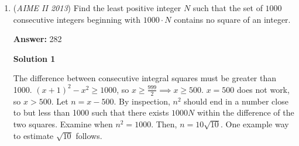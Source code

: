 \begin{enumerate}
\textbf{Solution 4}

Without loss of generality, say that the side length of triangle ABC is 3. EC is 1 and by the law of cosines, $AE^2=1+3^2-2(1)(3)\cos(\angle DAE)$ or $AE=\sqrt7$ The same goes for AD. DE equals 1 because AD and AE trisect BC. By the law of cosines, $\cos(\angle DAE)=(1-7-7)/-2(\sqrt7)(\sqrt7)=13/14$ Since $\sin^2(\angle DAE)=1-cos^2(\angle DAE)$ Then $\sin^2(\angle DAE)= 1-\frac{169}{196}=\frac{27}{196}$ So $\sin(\angle DAE)=\frac{3\sqrt{3}}{14}$. Therefore, $a + b + c = \boxed{020}$




\textbf{Solution 5 (Vectors)}

Setting up a convinient coordinate system, we let $A$ be at point $(0, 0)$, $B$ be at point $(3, 3\sqrt3)$, and $C$ be at point $(6, 0)$. Then $D$ and $E$ will be at points $(4, 2\sqrt3)$ and $(5, \sqrt3)$. Then $\cos(\angle DAE) = \frac{\vec{AD}\cdot\vec{AE}}{\|\vec{AD}\| \|\vec{AE}\|} = \frac{4\cdot5 + 2\sqrt{3}\cdot\sqrt{3}}{28}=\frac{13}{14}$. From here, we see that $\sin(\angle DAE) = \sqrt{1-\cos^2(\angle DAE)} = \frac{3\sqrt3}{14}\Longrightarrow\boxed{020}$




\textbf{Solution 6}

We first drop the altitude from $A$ to $BC$, and that evaluates to a length of $5$. Now, we can find $AD$ by Pythag. We have $AD = \sqrt{7}$. Now, we can set $\angle{DAE}$ to be $\theta$, and now we we can solve for $\sin{\theta}$. We will take advantage of the different ways to find the area of a triangle. We have the area of the triangle is $\dfrac{\dfrac{1}{2} \cdot \dfrac{3\sqrt3}{2}}{2} = \dfrac{3\sqrt3}{4}$. We can also express it as $\dfrac{1}{2} \cdot 7 \cdot \sin{\theta}$, and solving for $\sin{\theta}$, we get 
 \[\dfrac{3\sqrt3}{14} \Longrightarrow \boxed{020}\]



	\item (\textit{AIME II 2013}) Find the least positive integer $N$ such that the set of $1000$ consecutive integers beginning with $1000\cdot N$ contains no square of an integer.


 
 \textbf{Answer: }282



\textbf{Solution 1}

The difference between consecutive integral squares must be greater than 1000. $(x+1)^2-x^2\geq1000$, so $x\geq\frac{999}{2}\implies x\geq500$. $x=500$ does not work, so $x>500$. Let $n=x-500$. By inspection,  $n^2$ should end in a number close to but less than 1000 such that there exists $1000N$ within the difference of the two squares. Examine when $n^2=1000$. Then, $n=10\sqrt{10}$. One example way to estimate $\sqrt{10}$ follows. 


\end{enumerate}
